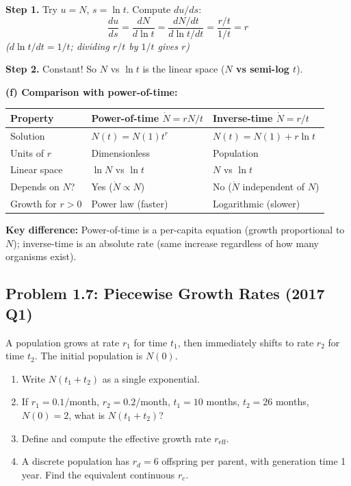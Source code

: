 \documentclass[10pt]{article}
\newcommand{\stepwhy}[1]{\textcolor{blue!60!black}{\small\textit{(#1)}}}
\begin{document}
\begin{solution}
\textbf{Step 1.} Try $u = N$, $s = \ln t$. Compute $du/ds$:
\[
\frac{du}{ds} = \frac{dN}{d\ln t} = \frac{dN/dt}{d\ln t/dt} = \frac{r/t}{1/t} = r
\]
\stepwhy{$d\ln t/dt = 1/t$; dividing $r/t$ by $1/t$ gives $r$}

\textbf{Step 2.} Constant! So $N$ vs $\ln t$ is the linear space (\textbf{$N$ vs semi-log $t$}).

\medskip\textbf{(f) Comparison with power-of-time:}

\begin{tabular}{lll}
\toprule
Property & Power-of-time $\dot N = rN/t$ & Inverse-time $\dot N = r/t$\\
\midrule
Solution & $N(t) = N(1)t^r$ & $N(t) = N(1) + r\ln t$\\
Units of $r$ & Dimensionless & Population\\
Linear space & $\ln N$ vs $\ln t$ & $N$ vs $\ln t$\\
Depends on $N$? & Yes ($\dot N \propto N$) & No ($\dot N$ independent of $N$)\\
Growth for $r>0$ & Power law (faster) & Logarithmic (slower)\\
\bottomrule
\end{tabular}

\textbf{Key difference:} Power-of-time is a per-capita equation (growth proportional to $N$); inverse-time is an absolute rate (same increase regardless of how many organisms exist).
\end{solution}

\subsection{Problem 1.7: Piecewise Growth Rates (2017 Q1)}

\begin{problem}
A population grows at rate $r_1$ for time $t_1$, then immediately shifts to rate $r_2$ for time $t_2$. The initial population is $N(0)$.

\begin{enumerate}[label=(\alph*)]
\item Write $N(t_1 + t_2)$ as a single exponential.
\item If $r_1 = 0.1/\text{month}$, $r_2 = 0.2/\text{month}$, $t_1 = 10$ months, $t_2 = 26$ months, $N(0) = 2$, what is $N(t_1+t_2)$?
\item Define and compute the effective growth rate $r_{\text{eff}}$.
\item A discrete population has $r_d = 6$ offspring per parent, with generation time 1 year. Find the equivalent continuous $r_c$.
\end{enumerate}
\end{problem}
\end{document}
